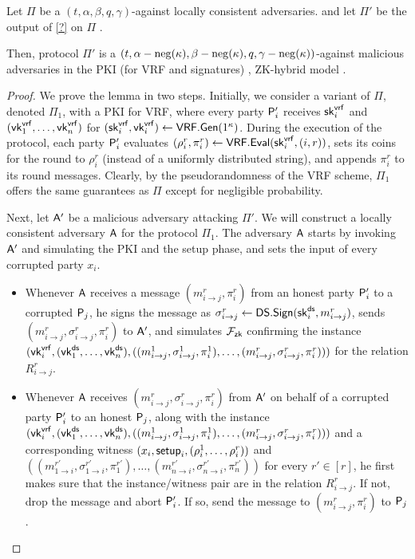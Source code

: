 \begin{lemma}\label{lem:local_to_malicious}
Let $\Pi$ be a $(t,\alpha,\beta,q,\gamma)$-\BA against locally consistent adversaries. and let $\Pi'$ be the output of \cref{?} on $\Pi$ .

 Then, protocol $\Pi'$ is a $\left(t,\alpha-\operatorname{neg}(\kappa),\beta-\operatorname{neg}(\kappa),q,\gamma-\operatorname{neg}(\kappa)\right)$-\BA against malicious adversaries in the PKI (for VRF and signatures) , ZK-hybrid  model .
\end{lemma}
\begin{proof}
We prove the lemma in two steps.
Initially, we consider a variant of $\Pi$, denoted $\Pi_1$, with a PKI for VRF, \ie where every party $\mathsf{P}_i'$ receives $\mathsf{sk}^{\mathsf{vrf}}_i$ and $(\mathsf{vk}^{\mathsf{vrf}}_1,\ldots,\mathsf{vk}^{\mathsf{vrf}}_n)$ for $(\mathsf{sk}^{\mathsf{vrf}}_i,\mathsf{vk}^{\mathsf{vrf}}_i)\gets\mathsf{VRF.Gen}(1^\kappa)$. During the execution of the protocol, each party $\mathsf{P}_i'$ evaluates $(\rho_i^r,\pi_i^r)\gets\mathsf{VRF.Eval}(\mathsf{sk}^{\mathsf{vrf}}_i,(i,r))$, sets its coins for the \rth round to $\rho_i^r$ (instead of a uniformly distributed string), and appends $\pi_i^r$ to its \rth round messages.
Clearly, by the pseudorandomness of the VRF scheme, $\Pi_1$ offers the same guarantees as $\Pi$ except for negligible probability.

Next, let $\mathsf{A}'$ be a malicious adversary attacking $\Pi'$. We will construct a locally consistent adversary $\mathsf{A}$ for the protocol $\Pi_1$. The adversary $\mathsf{A}$ starts by invoking $\mathsf{A}'$ and simulating the PKI and the setup phase, and sets the input of every corrupted party $x_i$.
\begin{itemize}
\item
Whenever $\mathsf{A}$ receives a message $(m^r_{i \to j},\pi_i^r)$ from an honest party $\mathsf{P}_i'$ to a corrupted $\mathsf{P}_j$, he signs the message as $\sigma_{i\to j}^r\gets\mathsf{DS.Sign}(\mathsf{sk}^{\mathsf{ds}}_i,m^r_{i \to j})$, sends $(m^r_{i \to j},\sigma^r_{i \to j},\pi_i^r)$ to $\mathsf{A}'$, and simulates $\mathcal{F}_\mathsf{zk}$ confirming the instance $(\mathsf{vk}^{\mathsf{vrf}}_i,(\mathsf{vk}^{\mathsf{ds}}_1,\ldots,\mathsf{vk}^{\mathsf{ds}}_n),((m_{i\to j}^1,\sigma_{i\to j}^1,\pi_i^1),\ldots,(m_{i\to j}^r,\sigma_{i\to j}^r,\pi_i^r)))$ for the relation $R^r_{i\to j}$.
\item
Whenever $\mathsf{A}$ receives $(m^r_{i \to j},\sigma^r_{i \to j},\pi_i^r)$ from $\mathsf{A}'$ on behalf of a corrupted party $\mathsf{P}_i'$ to an honest $\mathsf{P}_j$, along with the instance $(\mathsf{vk}^{\mathsf{vrf}}_i,(\mathsf{vk}^{\mathsf{ds}}_1,\ldots,\mathsf{vk}^{\mathsf{ds}}_n),((m_{i\to j}^1,\sigma_{i\to j}^1,\pi_i^1),\ldots,(m_{i\to j}^r,\sigma_{i\to j}^r,\pi_i^r)))$ and a corresponding witness $(x_i,\mathsf{setup}_i,(\rho_i^1,\ldots,\rho_i^r))$ and $((m^{r'}_{1\to i},\sigma^{r'}_{1\to i},\pi^{r'}_1),\ldots,(m^{r'}_{n\to i},\sigma^{r'}_{n\to i},\pi^{r'}_n))$ for every $r'\in[r]$, he first makes sure that the instance/witness pair are in the relation $R^r_{i\to j}$. If not, drop the message and abort $\mathsf{P}_i'$. If so, send the message to $(m^r_{i \to j},\pi_i^r)$ to $\mathsf{P}_j$.
\end{itemize}


\end{proof}
